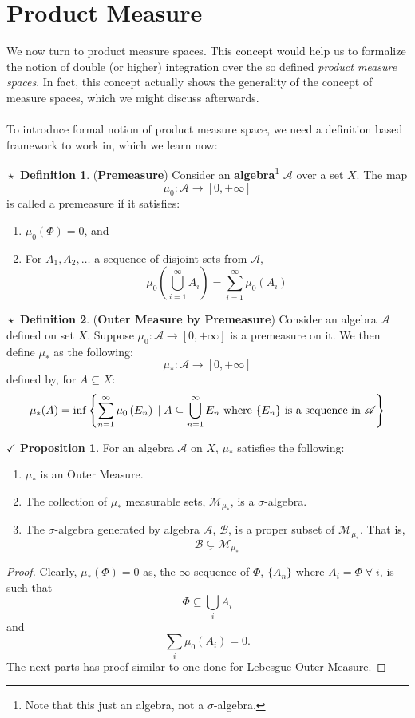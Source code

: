 \documentclass{article}
\theoremstyle{definition}
\newtheorem{definition}{$\boxed{\star}$ Definition}
\theoremstyle{remark}
\theoremstyle{definition}
\theoremstyle{definition}
\newtheorem{proposition}{$\checkmark$ Proposition}
\theoremstyle{definition}
\newcommand{\bunion}{\bigcup}
\newcommand{\where}{\;\vert\;}
\newcommand{\alg}[1]{\mathscr{#1}}
\newcommand{\set}[1]{\mathscr{#1}}
\newcommand{\msigm}[1]{\set{M}_{#1}}
\newcommand{\prem}[1]{\mu_{0}\left (#1\right )}
\newcommand{\opm}[1]{\mu_{*}\left (#1\right)}
\begin{document}
\section{Product Measure}
We now turn to product measure spaces. This concept would help us to formalize the notion of double (or higher) integration over the so defined \emph{product measure spaces}. In fact, this concept actually shows the generality of the concept of measure spaces, which we might discuss afterwards.\\\\
To introduce formal notion of product measure space, we need a definition based framework to work in, which we learn now:
\begin{definition}
	(\textbf{Premeasure}) Consider an \textbf{algebra}\footnote{Note that this just an algebra, not a $ \sigma $-algebra.} $ \alg{A}$ over a set $ X $. The map 
	\[\mu_{0} : \alg{A} \longrightarrow [0,+\infty]\]
	is called a premeasure if it satisfies:
	\begin{enumerate}
		\item {$ \prem{\Phi} = 0$, and}
		\item {For $ A_1,A_2,\dots $ a sequence of disjoint sets from $ \alg{A} $,
	\[\prem{\bunion_{i=1}^{\infty} A_i} = \sum_{i=1}^{\infty} \prem{A_i}\]	
	}
	\end{enumerate}
\end{definition}
\hrulefill
\begin{definition}\label{D-37}
	(\textbf{Outer Measure by Premeasure}) Consider an algebra $ \alg{A} $ defined on set $ X $. Suppose $ \mu_{0} : \alg{A} \to [0,+\infty] $ is a premeasure on it. We then define $ \mu_{*} $ as the following:
	\[\mu_{*} : \alg{A} \longrightarrow [0,+\infty]\]
	defined by, for $ A \subseteq X $:
	\[\mu_{*}(A) = \inf \left \{\sum_{n=1}^{\infty} \prem{E_n} \where A \subseteq \bunion_{n=1}^{\infty} E_n\text{ where } \{E_n\}\text{ is a sequence in $ \alg{A} $}\right \}\]
\end{definition}
\hrulefill
\begin{proposition}\label{P-39}
	For an algebra $ \alg{A} $ on $ X $, $ \mu_{*} $ satisfies the following:
	\begin{enumerate}
		\item {$ \mu_{*} $ is an Outer Measure.}
		\item {The collection of $ \mu_{*} $ measurable sets, $ \msigm{\mu_{*}} $, is a $ \sigma $-algebra.}
		\item {The $ \sigma $-algebra generated by algebra $ \alg{A} $, $ \alg{B} $, is a proper subset of $ \msigm{\mu_{*}} $. That is,
	\[\alg{B} \subsetneq \msigm{\mu_{*}}\]	
}
	\end{enumerate}
\end{proposition}
\begin{proof}
	Clearly, $ \opm{\Phi} = 0$ as, the $ \infty $ sequence of $ \Phi $, $ \{A_n\} $ where $ A_i = \Phi \;\forall\;i$, is such that
	\[\Phi \subseteq \bunion_{i}A_i\]
	and 
	\[\sum_{i} \prem{A_i} = 0.\]
	The next parts has proof similar to one done for Lebesgue Outer Measure.
\end{proof}
\hrulefill
\newpage
\end{document}
